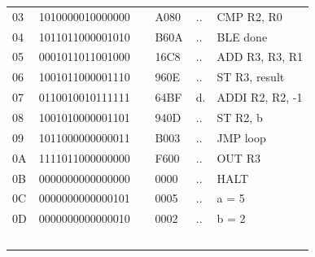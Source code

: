 \begin{tcolorbox}[stepbox, title={Instruction 14 \hfill ticks 40 to 42 \quad ST R3, result}]
{\begin{tabular}{@{}lllll@{}}
03 & 1010000010000000 & A080 & .. & CMP R2, R0\\
04 & 1011011000001010 & B60A & .. & BLE done\\
05 & 0001011011001000 & 16C8 & .. & ADD R3, R3, R1\\
06 & 1001011000001110 & 960E & .. & ST R3, result\\
\rowcolor{pcc}07 & 0110010010111111 & 64BF & d. & ADDI R2, R2, -1\\
08 & 1001010000001101 & 940D & .. & ST R2, b\\
09 & 1011000000000011 & B003 & .. & JMP loop\\
0A & 1111011000000000 & F600 & .. & OUT R3\\
0B & 0000000000000000 & 0000 & .. & HALT\\
\rowcolor{datac}0C & 0000000000000101 & 0005 & .. & a = 5\\
\rowcolor{datac}0D & 0000000000000010 & 0002 & .. & b = 2\\
\rowcolor{wrt}\textcolor{white}{\textbf{0E}} & \textcolor{white}{\textbf{0000000000001010}} & \textcolor{white}{\textbf{000A}} & \textcolor{white}{\textbf{..}} & \textcolor{white}{\textbf{result = 10}}\\
\end{tabular}}
\end{tcolorbox}\par\vspace{3pt}
